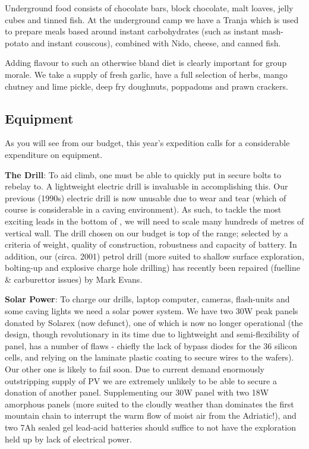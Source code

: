 Underground food consists of chocolate bars, block chocolate, malt loaves, jelly cubes and tinned fish. At the underground camp we have a Tranja which is used to prepare meals based around instant carbohydrates (such as instant mash-potato and instant couscous), combined with Nido, cheese, and canned fish.

Adding flavour to such an otherwise bland diet is clearly important for group morale. We take a supply of fresh garlic, have a full selection of herbs, mango chutney and lime pickle, deep fry doughnuts, poppadoms and prawn crackers.


\subsection{Equipment}

As you will see from our budget, this year's expedition calls for a considerable expenditure on equipment.

\textbf{The Drill}: To aid climb, one must be able to quickly put in secure bolts to rebelay to. A lightweight electric drill is invaluable in accomplishing this. Our previous (1990s) electric drill is now unusable due to  wear and tear (which of course is considerable in a caving environment). As such, to tackle the most exciting leads in the bottom of , we will need to scale many hundreds of metres of vertical wall. The drill chosen on our budget is top of the range; selected by a criteria of weight, quality of construction, robustness and capacity of battery. In addition, our (circa. 2001) petrol drill (more suited to shallow surface exploration, bolting-up and explosive charge hole drilling) has recently been repaired (fuelline \& carburettor issues) by Mark Evans.

\textbf{Solar Power}: To charge our drills, laptop computer, cameras, flash-units and some caving lights we need a solar power system. We have two 30W peak panels donated by Solarex (now defunct), one of which is now no longer operational (the design, though revolutionary in its time due to lightweight and semi-flexibility of panel, has a number of flaws - chiefly the lack of bypass diodes for the 36 silicon cells, and relying on the laminate plastic coating to secure wires to the wafers). Our other one is likely to fail soon. Due to current demand enormously outstripping supply of PV we are extremely unlikely to be able to secure a donation of another panel. Supplementing our 30W panel with two 18W amorphous panels (more suited to the cloudly weather than dominates the first mountain chain to interrupt the warm flow of moist air from the Adriatic!), and two 7Ah sealed gel lead-acid batteries should suffice to not have the exploration held up by lack of electrical power.

